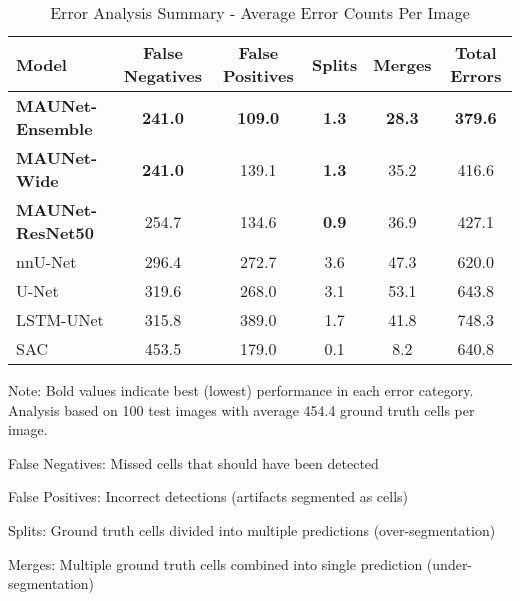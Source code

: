 \begin{table}[htbp]
\centering
\caption{Error Analysis Summary - Average Error Counts Per Image}
\label{tab:error_analysis}
\begin{tabular}{lccccc}
\toprule
\textbf{Model} & \textbf{False Negatives} & \textbf{False Positives} & \textbf{Splits} & \textbf{Merges} & \textbf{Total Errors} \\
\midrule
\textbf{MAUNet-Ensemble} & \textbf{241.0} & \textbf{109.0} & \textbf{1.3} & \textbf{28.3} & \textbf{379.6} \\
\textbf{MAUNet-Wide} & \textbf{241.0} & 139.1 & \textbf{1.3} & 35.2 & 416.6 \\
\textbf{MAUNet-ResNet50} & 254.7 & 134.6 & \textbf{0.9} & 36.9 & 427.1 \\
nnU-Net & 296.4 & 272.7 & 3.6 & 47.3 & 620.0 \\
U-Net & 319.6 & 268.0 & 3.1 & 53.1 & 643.8 \\
LSTM-UNet & 315.8 & 389.0 & 1.7 & 41.8 & 748.3 \\
SAC & 453.5 & 179.0 & 0.1 & 8.2 & 640.8 \\
\bottomrule
\end{tabular}
\begin{tablenotes}
\small
\item Note: Bold values indicate best (lowest) performance in each error category. Analysis based on 100 test images with average 454.4 ground truth cells per image.
\item False Negatives: Missed cells that should have been detected
\item False Positives: Incorrect detections (artifacts segmented as cells)
\item Splits: Ground truth cells divided into multiple predictions (over-segmentation)
\item Merges: Multiple ground truth cells combined into single prediction (under-segmentation)
\end{tablenotes}
\end{table}
